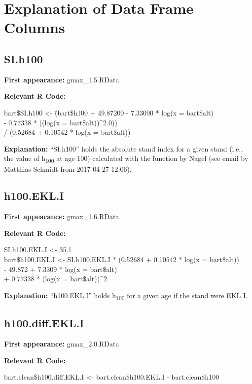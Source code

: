 \section{Explanation of Data Frame Columns}

\subsection{SI.h100}
\textbf{First appearance:} gmax\_1.5.RData

\textbf{Relevant R Code:}

\begin{rcode}
  bart\$SI.h100 <- \=(bart\$h100 + 49.87200 - 7.33090 * log(x = bart\$alt) \\
  \>- 0.77338 * ((log(x = bart\$alt))\textasciicircum 2.0)) \\
  \>/ (0.52684 + 0.10542 * log(x = bart\$alt))
\end{rcode}

\textbf{Explanation:} ``SI.h100'' holds the absolute stand index for a given stand (i.e., the value of h\textsubscript{100} at age \SI{100}{\years}) calculated with the function by Nagel (see email by Matthias Schmidt from 2017-04-27 12:06).

\subsection{h100.EKL.I}
\textbf{First appearance:} gmax\_1.6.RData

\textbf{Relevant R Code:}

\begin{rcode}
  SI.h100.EKL.I <- 35.1 \\
  bart\$h100.EKL.I <- \=SI.h100.EKL.I * (0.52684 + 0.10542 * log(x = bart\$alt)) \\
  \>- 49.872 + 7.3309 * log(x = bart\$alt) \\
  \>+ 0.77338 * (log(x = bart\$alt))\textasciicircum 2
\end{rcode}

\textbf{Explanation:} ``h100.EKL.I'' holds h\textsubscript{100} for a given age if the stand were EKL I.

\subsection{h100.diff.EKL.I}
\textbf{First appearance:} gmax\_2.0.RData

\textbf{Relevant R Code:}

\begin{rcode}
  bart.clean\$h100.diff.EKL.I <- bart.clean\$h100.EKL.I - bart.clean\$h100
\end{rcode}

